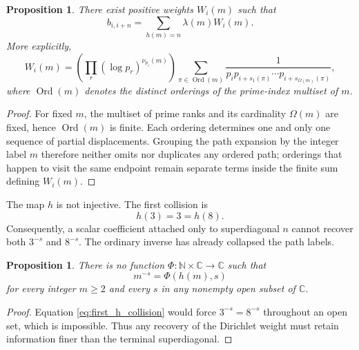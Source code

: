 \documentclass[11pt]{amsart}
\numberwithin{equation}{section}
\theoremstyle{plain}
\newtheorem{proposition}[theorem]{Proposition}
\theoremstyle{definition}
\theoremstyle{remark}
\newcommand{\N}{\mathbb N}
\newcommand{\C}{\mathbb C}
\newcommand{\Ord}{\operatorname{Ord}}
\begin{document}
\begin{proposition}
\label{prop:collapsed_liouville}
There exist positive weights $W_i(m)$ such that
\begin{equation}
b_{i,i+n}=\sum_{h(m)=n}\lambda(m)W_i(m).
\label{eq:collapsed_liouville}
\end{equation}
More explicitly,
\begin{equation}
W_i(m)=
\left(\prod_r(\log p_r)^{\nu_{p_r}(m)}\right)
\sum_{\pi\in\Ord(m)}
\frac1{p_i p_{i+s_1(\pi)}\cdots p_{i+s_{\Omega(m)}(\pi)}},
\label{eq:Wi_definition}
\end{equation}
where $\Ord(m)$ denotes the distinct orderings of the prime-index multiset of $m$.
\end{proposition}

\begin{proof}
For fixed $m$, the multiset of prime ranks and its cardinality $\Omega(m)$ are fixed, hence $\Ord(m)$ is finite.  Each ordering determines one and only one sequence of partial displacements.  Grouping the path expansion by the integer label $m$ therefore neither omits nor duplicates any ordered path; orderings that happen to visit the same endpoint remain separate terms inside the finite sum defining $W_i(m)$.
\end{proof}

The map $h$ is not injective.  The first collision is
\begin{equation}
h(3)=3=h(8).
\label{eq:first_h_collision}
\end{equation}
Consequently, a scalar coefficient attached only to superdiagonal $n$ cannot recover both $3^{-s}$ and $8^{-s}$.  The ordinary inverse has already collapsed the path labels.

\begin{proposition}
\label{prop:no_scalar_decompression}
There is no function $\Phi:\N\times\C\to\C$ such that
\begin{equation}
m^{-s}=\Phi(h(m),s)
\label{eq:no_scalar_decompression}
\end{equation}
for every integer $m\ge2$ and every $s$ in any nonempty open subset of $\C$.
\end{proposition}

\begin{proof}
Equation \eqref{eq:first_h_collision} would force $3^{-s}=8^{-s}$ throughout an open set, which is impossible.  Thus any recovery of the Dirichlet weight must retain information finer than the terminal superdiagonal.
\end{proof}
\end{document}
